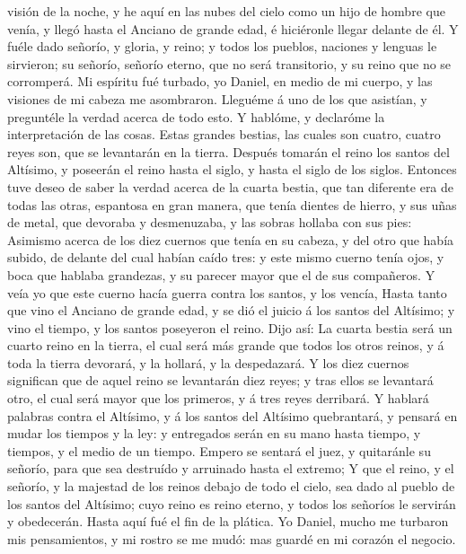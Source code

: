 visión de la noche, y he aquí en las nubes del cielo como un hijo de
hombre que venía, y llegó hasta el Anciano de grande edad, é hiciéronle
llegar delante de él.  Y fuéle dado señorío, y gloria, y
reino; y todos los pueblos, naciones y lenguas le sirvieron; su señorío,
señorío eterno, que no será transitorio, y su reino que no se
corromperá.  Mi espíritu fué turbado, yo Daniel, en medio
de mi cuerpo, y las visiones de mi cabeza me asombraron. 
Lleguéme á uno de los que asistían, y preguntéle la verdad acerca de
todo esto. Y hablóme, y declaróme la interpretación de las cosas.
 Estas grandes bestias, las cuales son cuatro, cuatro reyes
son, que se levantarán en la tierra.  Después tomarán el
reino los santos del Altísimo, y poseerán el reino hasta el siglo, y
hasta el siglo de los siglos.  Entonces tuve deseo de saber
la verdad acerca de la cuarta bestia, que tan diferente era de todas las
otras, espantosa en gran manera, que tenía dientes de hierro, y sus uñas
de metal, que devoraba y desmenuzaba, y las sobras hollaba con sus pies:
 Asimismo acerca de los diez cuernos que tenía en su
cabeza, y del otro que había subido, de delante del cual habían caído
tres: y este mismo cuerno tenía ojos, y boca que hablaba grandezas, y su
parecer mayor que el de sus compañeros.  Y veía yo que este
cuerno hacía guerra contra los santos, y los vencía,  Hasta
tanto que vino el Anciano de grande edad, y se dió el juicio á los
santos del Altísimo; y vino el tiempo, y los santos poseyeron el reino.
 Dijo así: La cuarta bestia será un cuarto reino en la
tierra, el cual será más grande que todos los otros reinos, y á toda la
tierra devorará, y la hollará, y la despedazará.  Y los
diez cuernos significan que de aquel reino se levantarán diez reyes; y
tras ellos se levantará otro, el cual será mayor que los primeros, y á
tres reyes derribará.  Y hablará palabras contra el
Altísimo, y á los santos del Altísimo quebrantará, y pensará en mudar
los tiempos y la ley: y entregados serán en su mano hasta tiempo, y
tiempos, y el medio de un tiempo.  Empero se sentará el
juez, y quitaránle su señorío, para que sea destruído y arruinado hasta
el extremo;  Y que el reino, y el señorío, y la majestad de
los reinos debajo de todo el cielo, sea dado al pueblo de los santos del
Altísimo; cuyo reino es reino eterno, y todos los señoríos le servirán y
obedecerán.  Hasta aquí fué el fin de la plática. Yo
Daniel, mucho me turbaron mis pensamientos, y mi rostro se me mudó: mas
guardé en mi corazón el negocio.

